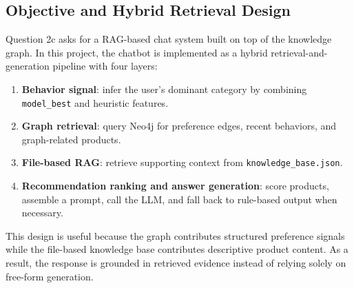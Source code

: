 \documentclass[12pt,a4paper]{article}
\begin{document}
\subsection{Objective and Hybrid Retrieval Design}
Question 2c asks for a RAG-based chat system built on top of the knowledge graph. In this project, the chatbot is implemented as a hybrid retrieval-and-generation pipeline with four layers:
\begin{enumerate}[label=\arabic*.]
  \item \textbf{Behavior signal}: infer the user's dominant category by combining \texttt{model\_best} and heuristic features.
  \item \textbf{Graph retrieval}: query Neo4j for preference edges, recent behaviors, and graph-related products.
  \item \textbf{File-based RAG}: retrieve supporting context from \texttt{knowledge\_base.json}.
  \item \textbf{Recommendation ranking and answer generation}: score products, assemble a prompt, call the LLM, and fall back to rule-based output when necessary.
\end{enumerate}

This design is useful because the graph contributes structured preference signals while the file-based knowledge base contributes descriptive product content. As a result, the response is grounded in retrieved evidence instead of relying solely on free-form generation.
\end{document}
